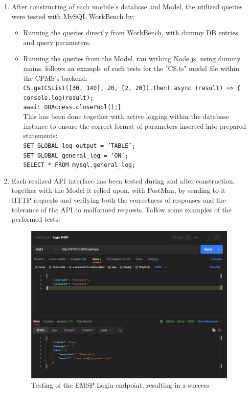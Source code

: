 \documentclass[11pt]{article}
\newcommand{\code}[1]{\colorbox{light-gray}{\texttt{#1}}}
\def\code#1{{\texttt{#1}}}
\begin{document}
\begin{enumerate}
    \item After constructing of each module's database and Model, the utilized queries were tested with MySQL WorkBench by:
    \begin{itemize}
        \item Running the queries directly from WorkBench, with dummy DB entries and query parameters.
        \item Running the queries from the Model, ran withing Node,js, using dummy mains, follows an example of such tests for the "CS.ts" model file within the CPMS's backend: \\
        \code{CS.getCSList([30, 140], 20, [2, 20]).then(
                async (result) => \{
                console.log(result); \\
            await DBAccess.closePool();\}} \\
            This has been done together with active logging within the database instance to ensure the correct format of parameters inserted into prepared statements: \\
        \code{SET GLOBAL log\_output = 'TABLE';\\
                SET GLOBAL general\_log = 'ON';\\
                SELECT * FROM mysql.general\_log;}
    \end{itemize}
    
    \item Each realized API interface has been tested during and after construction, together with the Model it relied upon, with PostMan, by sending to it HTTP requests and verifying both the correctness of responses and the tolerance of the API to malformed requests. Follow some examples of the performed tests:
    
    \newpage
    
    \begin{figure}[!ht]
        \centering
        \includegraphics[width=130mm]{LoginEMSP.PNG}
        \captionsetup{justification=centering,margin=2cm}
        \caption{Testing of the EMSP Login endpoint, resulting in a success}
        \label{fig:my_label}
    \end{figure}
    

\end{enumerate}
\end{document}
